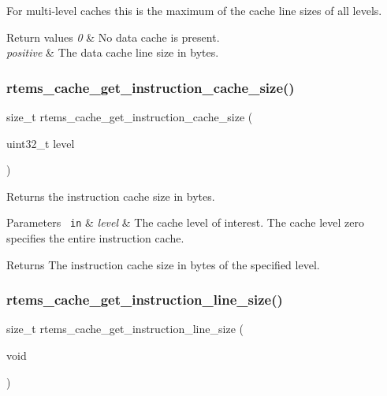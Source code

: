 For multi-\/level caches this is the maximum of the cache line sizes of all levels.


\begin{DoxyRetVals}{Return values}
{\em 0} & No data cache is present. \\
\hline
{\em positive} & The data cache line size in bytes. \\
\hline
\end{DoxyRetVals}
\mbox{\label{group__ClassicCache_ga726a484e646935c5ab2f948cefe5e851}} 
\subsubsection{\texorpdfstring{rtems\_cache\_get\_instruction\_cache\_size()}{rtems\_cache\_get\_instruction\_cache\_size()}}
{\footnotesize\ttfamily size\+\_\+t rtems\+\_\+cache\+\_\+get\+\_\+instruction\+\_\+cache\+\_\+size (\begin{DoxyParamCaption}\item[{uint32\+\_\+t}]{level }\end{DoxyParamCaption})}



Returns the instruction cache size in bytes. 


\begin{DoxyParams}[1]{Parameters}
\mbox{\texttt{ in}}  & {\em level} & The cache level of interest. The cache level zero specifies the entire instruction cache.\\
\hline
\end{DoxyParams}
\begin{DoxyReturn}{Returns}
The instruction cache size in bytes of the specified level. 
\end{DoxyReturn}
\mbox{\label{group__ClassicCache_gaef20a7d7cd4b22c17478ced466913d60}} 
\subsubsection{\texorpdfstring{rtems\_cache\_get\_instruction\_line\_size()}{rtems\_cache\_get\_instruction\_line\_size()}}
{\footnotesize\ttfamily size\+\_\+t rtems\+\_\+cache\+\_\+get\+\_\+instruction\+\_\+line\+\_\+size (\begin{DoxyParamCaption}\item[{void}]{ }\end{DoxyParamCaption})}



